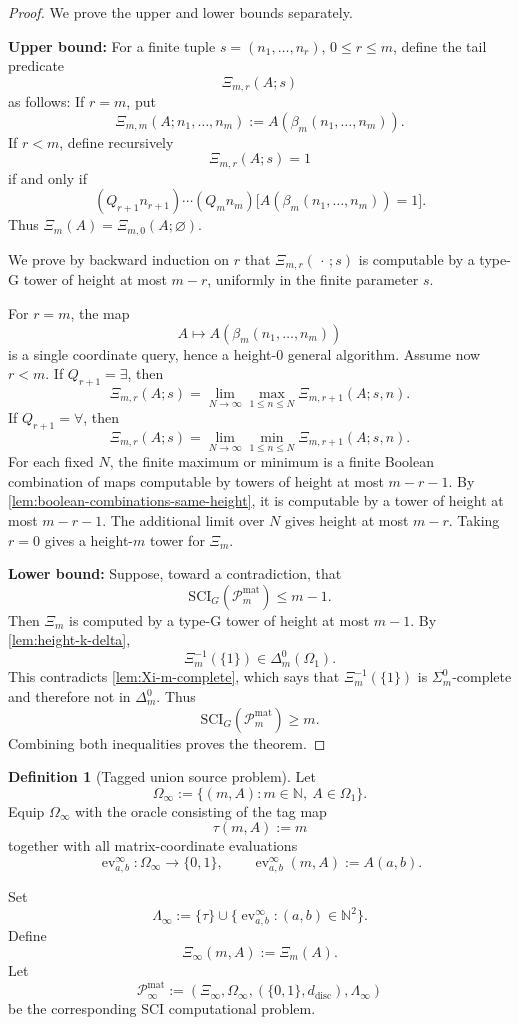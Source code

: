 \documentclass{lmcs} %
\theoremstyle{plain}
\theoremstyle{plain}
\theoremstyle{definition}
\newtheorem{definition}[theorem]{Definition}
\theoremstyle{remark}
\theoremstyle{definition}
\theoremstyle{remark}
\numberwithin{equation}{section}
\begin{document}
\begin{proof}
We prove the upper and lower bounds separately.

\smallskip
\noindent\textbf{Upper bound:}
For a finite tuple \(s=(n_1,\ldots,n_r)\), \(0\le r\le m\), define the tail predicate
\[
\Xi_{m,r}(A;s)
\]
as follows: If \(r=m\), put
\[
\Xi_{m,m}(A;n_1,\ldots,n_m) := A(\beta_m(n_1,\ldots,n_m)).
\]
If \(r<m\), define recursively
\[
\Xi_{m,r}(A;s)=1
\]
if and only if
\[
(Q_{r+1} n_{r+1})\cdots(Q_m n_m) \bigl[A(\beta_m(n_1,\ldots,n_m))=1\bigr].
\]
Thus \(\Xi_m(A)=\Xi_{m,0}(A;\varnothing)\).

We prove by backward induction on \(r\) that \(\Xi_{m,r}(\,\cdot\,;s)\) is computable by a type-G tower of height at most \(m-r\), uniformly in the finite parameter \(s\).

For \(r=m\), the map
\[
A\mapsto A(\beta_m(n_1,\ldots,n_m))
\]
is a single coordinate query, hence a height-\(0\) general algorithm. Assume now \(r<m\). If \(Q_{r+1}=\exists\), then
\[
\Xi_{m,r}(A;s) = \lim_{N\to\infty} \max_{1\le n\le N}\Xi_{m,r+1}(A;s,n).
\]
If \(Q_{r+1}=\forall\), then
\[
\Xi_{m,r}(A;s) = \lim_{N\to\infty} \min_{1\le n\le N}\Xi_{m,r+1}(A;s,n).
\]
For each fixed \(N\), the finite maximum or minimum is a finite Boolean combination of maps computable by towers of height at most \(m-r-1\). By \cref{lem:boolean-combinations-same-height}, it is computable by a tower of height at most \(m-r-1\). The additional limit over \(N\) gives height at most \(m-r\). Taking \(r=0\) gives a height-\(m\) tower for \(\Xi_m\).

\smallskip
\noindent\textbf{Lower bound:}
Suppose, toward a contradiction, that
\[
\mathrm{SCI}_G(\mathcal P_m^{\mathrm{mat}})\le m-1.
\]
Then \(\Xi_m\) is computed by a type-G tower of height at most \(m-1\). By \cref{lem:height-k-delta},
\[
\Xi_m^{-1}(\{1\})\in\Delta^0_m(\Omega_1).
\]
This contradicts \cref{lem:Xi-m-complete}, which says that \(\Xi_m^{-1}(\{1\})\) is \(\Sigma^0_m\)-complete and therefore not in \(\Delta^0_m\).
Thus
\[
\mathrm{SCI}_G(\mathcal P_m^{\mathrm{mat}})\ge m.
\]
Combining both inequalities proves the theorem.
\end{proof}

\begin{definition}[Tagged union source problem]
Let
\[
\Omega_\infty:=\{(m,A) : m\in\mathbb N,\ A\in\Omega_1\}.
\]
Equip \(\Omega_\infty\) with the oracle consisting of the tag map
\[
\tau(m,A):=m
\]
together with all matrix-coordinate evaluations
\[
        \operatorname{ev}_{a,b}^{\infty}:\Omega_\infty\to\{0,1\}, \qquad
        \operatorname{ev}_{a,b}^{\infty}(m,A):=A(a,b).
\]

Set
\[
        \Lambda_\infty := \{\tau\}\cup \{\operatorname{ev}_{a,b}^{\infty} : (a,b)\in\mathbb N^2\}.
\]
Define
\[
\Xi_\infty(m,A):=\Xi_m(A).
\]
Let
\[
\mathcal P_\infty^{\mathrm{mat}} := (\Xi_\infty,\Omega_\infty,(\{0,1\},d_{\mathrm{disc}}),\Lambda_\infty)
\]
be the corresponding SCI computational problem.
\end{definition}
\end{document}
